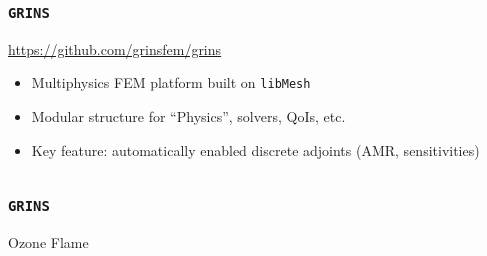 \begin{frame}
\frametitle{\texttt{GRINS}}

\begin{block}{\url{https://github.com/grinsfem/grins}}
  \begin{itemize}
  \item Multiphysics FEM platform built on \texttt{libMesh}
  \item Modular structure for ``Physics'', solvers, QoIs, etc.
  \item Key feature: automatically enabled discrete adjoints (AMR, sensitivities)
  \end{itemize}
\end{block}

\begin{columns}[T]
  \begin{column}{0.4\textwidth}
  \end{column}
  \begin{column}{0.4\textwidth}
  \end{column}
  \begin{column}{0.2\textwidth}
  \end{column}
  \end{columns}

\end{frame}

\begin{frame}
  \frametitle{\texttt{GRINS}}

\begin{block}{Ozone Flame}
\end{block}


\end{frame}
